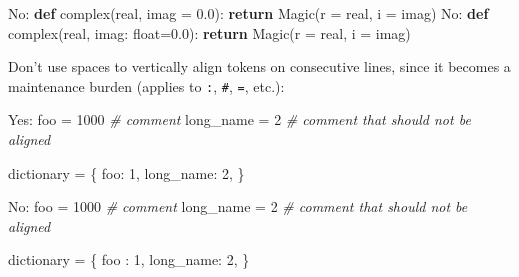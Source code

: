 \documentclass[
]{article}
\newenvironment{Shaded}{}{}
\newcommand{\BuiltInTok}[1]{\textcolor[rgb]{0.00,0.50,0.00}{#1}}
\newcommand{\CommentTok}[1]{\textcolor[rgb]{0.38,0.63,0.69}{\textit{#1}}}
\newcommand{\ControlFlowTok}[1]{\textcolor[rgb]{0.00,0.44,0.13}{\textbf{#1}}}
\newcommand{\DecValTok}[1]{\textcolor[rgb]{0.25,0.63,0.44}{#1}}
\newcommand{\FloatTok}[1]{\textcolor[rgb]{0.25,0.63,0.44}{#1}}
\newcommand{\KeywordTok}[1]{\textcolor[rgb]{0.00,0.44,0.13}{\textbf{#1}}}
\newcommand{\NormalTok}[1]{#1}
\newcommand{\OperatorTok}[1]{\textcolor[rgb]{0.40,0.40,0.40}{#1}}
\newcommand{\StringTok}[1]{\textcolor[rgb]{0.25,0.44,0.63}{#1}}
\begin{document}
\begin{samepage}
\begin{Shaded}
\begin{Highlighting}[]
\NormalTok{No:  }\KeywordTok{def} \BuiltInTok{complex}\NormalTok{(real, imag }\OperatorTok{=} \FloatTok{0.0}\NormalTok{): }\ControlFlowTok{return}\NormalTok{ Magic(r }\OperatorTok{=}\NormalTok{ real, i }\OperatorTok{=}\NormalTok{ imag)}
\NormalTok{No:  }\KeywordTok{def} \BuiltInTok{complex}\NormalTok{(real, imag: }\BuiltInTok{float}\OperatorTok{=}\FloatTok{0.0}\NormalTok{): }\ControlFlowTok{return}\NormalTok{ Magic(r }\OperatorTok{=}\NormalTok{ real, i }\OperatorTok{=}\NormalTok{ imag)}
\end{Highlighting}
\end{Shaded}
\end{samepage}

Don't use spaces to vertically align tokens on consecutive lines, since
it becomes a maintenance burden (applies to \texttt{:}, \texttt{\#},
\texttt{=}, etc.):

\begin{samepage}
\begin{Shaded}
\begin{Highlighting}[]
\NormalTok{Yes:}
\NormalTok{  foo }\OperatorTok{=} \DecValTok{1000}  \CommentTok{\# comment}
\NormalTok{  long\_name }\OperatorTok{=} \DecValTok{2}  \CommentTok{\# comment that should not be aligned}

\NormalTok{  dictionary }\OperatorTok{=}\NormalTok{ \{}
      \StringTok{\textquotesingle{}foo\textquotesingle{}}\NormalTok{: }\DecValTok{1}\NormalTok{,}
      \StringTok{\textquotesingle{}long\_name\textquotesingle{}}\NormalTok{: }\DecValTok{2}\NormalTok{,}
\NormalTok{  \}}
\end{Highlighting}
\end{Shaded}
\end{samepage}

\begin{samepage}
\begin{Shaded}
\begin{Highlighting}[]
\NormalTok{No:}
\NormalTok{  foo       }\OperatorTok{=} \DecValTok{1000}  \CommentTok{\# comment}
\NormalTok{  long\_name }\OperatorTok{=} \DecValTok{2}     \CommentTok{\# comment that should not be aligned}

\NormalTok{  dictionary }\OperatorTok{=}\NormalTok{ \{}
      \StringTok{\textquotesingle{}foo\textquotesingle{}}\NormalTok{      : }\DecValTok{1}\NormalTok{,}
      \StringTok{\textquotesingle{}long\_name\textquotesingle{}}\NormalTok{: }\DecValTok{2}\NormalTok{,}
\NormalTok{  \}}
\end{Highlighting}
\end{Shaded}
\end{samepage}
\end{document}
